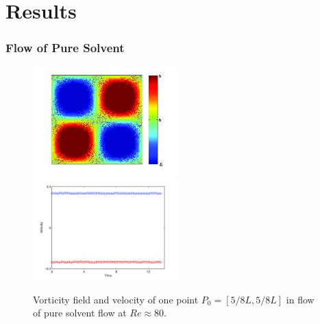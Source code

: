 \section{Results}
\begin{frame}
  \frametitle{Flow of Pure Solvent}

\begin{figure}
    \centering
    \includegraphics[width=0.5\textwidth]{img/polymer_loc-15.png}
    \includegraphics[width=0.5\textwidth]{img/polymer_loc-9.png}
    \caption{Vorticity field and velocity of one point $P_0=[5/8L,5/8L]$ in flow of pure solvent flow at $Re\approx 80$.}
    \label{fig:vor_sol}
  \end{figure}
\end{frame}

